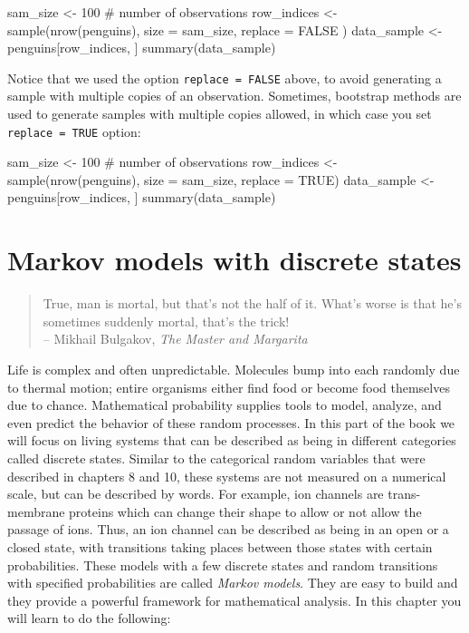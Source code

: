 \documentclass[
  letterpaper,
  DIV=11,
  numbers=noendperiod]{scrreprt}
\newenvironment{Shaded}{\begin{snugshade}}{\end{snugshade}}
\newcommand{\NormalTok}[1]{\textcolor[rgb]{0.00,0.23,0.31}{#1}}
\begin{document}
\begin{Shaded}
\begin{Highlighting}[]
\NormalTok{sam\_size \textless{}{-} 100 \# number of observations}
\NormalTok{row\_indices \textless{}{-} sample(nrow(penguins), size = sam\_size, replace = FALSE )}
\NormalTok{data\_sample \textless{}{-} penguins[row\_indices, ]}
\NormalTok{summary(data\_sample)}
\end{Highlighting}
\end{Shaded}

Notice that we used the option \texttt{replace\ =\ FALSE} above, to
avoid generating a sample with multiple copies of an observation.
Sometimes, bootstrap methods are used to generate samples with multiple
copies allowed, in which case you set \texttt{replace\ =\ TRUE} option:

\begin{Shaded}
\begin{Highlighting}[]
\NormalTok{sam\_size \textless{}{-} 100 \# number of observations}
\NormalTok{row\_indices \textless{}{-} sample(nrow(penguins), size = sam\_size, replace = TRUE)}
\NormalTok{data\_sample \textless{}{-} penguins[row\_indices, ]}
\NormalTok{summary(data\_sample)}
\end{Highlighting}
\end{Shaded}


\hypertarget{markov-models-with-discrete-states}{%
\chapter{Markov models with discrete
states}\label{markov-models-with-discrete-states}}

\begin{quote}
True, man is mortal, but that's not the half of it. What's worse is that
he's sometimes suddenly mortal, that's the trick!\\
-- Mikhail Bulgakov, \emph{The Master and Margarita}
\end{quote}

Life is complex and often unpredictable. Molecules bump into each
randomly due to thermal motion; entire organisms either find food or
become food themselves due to chance. Mathematical probability supplies
tools to model, analyze, and even predict the behavior of these random
processes. In this part of the book we will focus on living systems that
can be described as being in different categories called discrete
states. Similar to the categorical random variables that were described
in chapters 8 and 10, these systems are not measured on a numerical
scale, but can be described by words. For example, ion channels are
trans-membrane proteins which can change their shape to allow or not
allow the passage of ions. Thus, an ion channel can be described as
being in an open or a closed state, with transitions taking places
between those states with certain probabilities. These models with a few
discrete states and random transitions with specified probabilities are
called \emph{Markov models}. They are easy to build and they provide a
powerful framework for mathematical analysis. In this chapter you will
learn to do the following:
\end{document}
